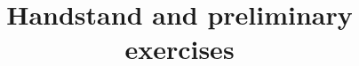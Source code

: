
\graphicspath{{../../../images/Exercises/}} %


\title{Handstand and preliminary exercises} %





\begin{frame}
\titlepage %
\end{frame}



 